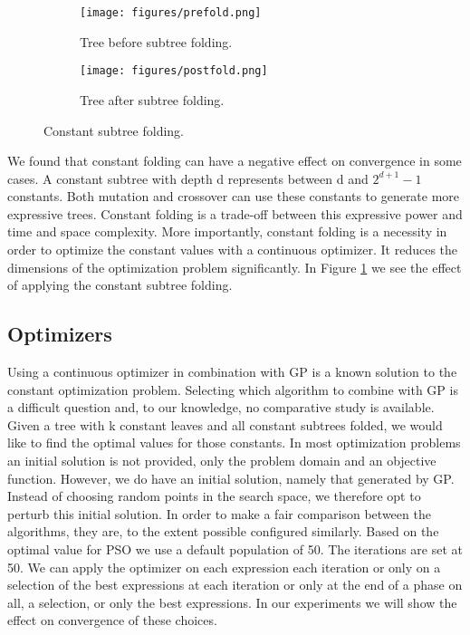 \begin{figure}
	\centering
    \begin{subfigure}{0.5\textwidth}
    \centering
    \texttt{[image: figures/prefold.png]}
    \caption{Tree before subtree folding.}
	\end{subfigure}
	\begin{subfigure}{0.5\textwidth}
    \centering
    \texttt{[image: figures/postfold.png]}
    \caption{Tree after subtree folding.}
	\end{subfigure}
	    \caption{Constant subtree folding.}
    \label{fig:folding}
\end{figure}
We found that constant folding can have a negative effect on convergence in some cases. A constant subtree with depth d represents between d and $2^{d+1}-1$ constants. Both mutation and crossover can use these constants to generate more expressive trees. Constant folding is a trade-off between this expressive power and time and space complexity. More importantly, constant folding is a necessity in order to optimize the constant values with a continuous optimizer. It reduces the dimensions of the optimization problem significantly. In Figure \ref{fig:folding} we see the effect of applying the constant subtree folding. 
\subsection{Optimizers}
Using a continuous optimizer in combination with GP is a known solution \cite{GEDE, GPConst} to the constant optimization problem.
Selecting which algorithm to combine with GP is a difficult question and, to our knowledge, no comparative study is available. Given a tree with k constant leaves and all constant subtrees folded, we would like to find the optimal values for those constants. In most optimization problems an initial solution is not provided, only the problem domain and an objective function. However, we do have an initial solution, namely that generated by GP. Instead of choosing random points in the search space, we therefore opt to perturb this initial solution. In order to make a fair comparison between the algorithms, they are, to the extent possible configured similarly. Based on the optimal value for PSO \cite{PSO} we use a default population of 50. The iterations are set at 50. We can apply the optimizer on each expression each iteration or only on a selection of the best expressions at each iteration or only at the end of a phase on all, a selection, or only the best expressions. In our experiments we will show the effect on convergence of these choices.
